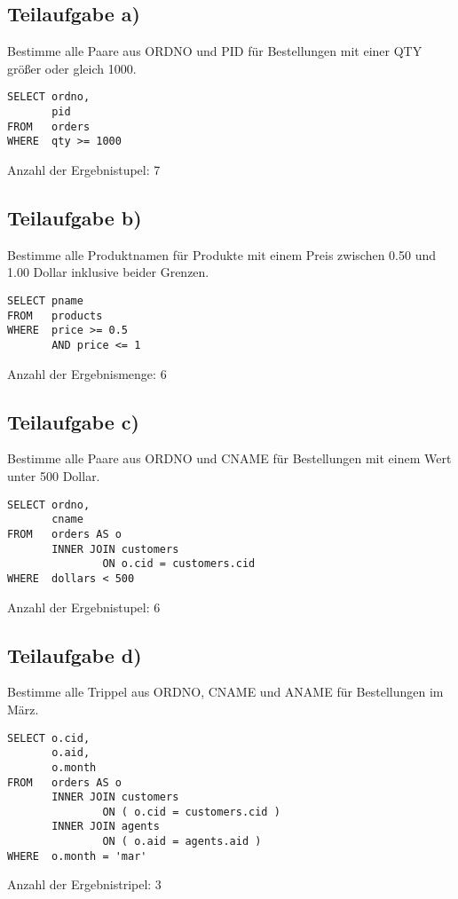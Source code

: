 \label{sec:Praktikumsaufgabe 2}
\lstset{language=SQL,numbers=none}

\subsection{Teilaufgabe a)}
\label{sec:Teilaufgabe a}
Bestimme alle Paare aus ORDNO und PID für Bestellungen mit einer QTY größer oder
gleich 1000.
\begin{lstlisting}
SELECT ordno, 
       pid 
FROM   orders 
WHERE  qty >= 1000
\end{lstlisting}
Anzahl der Ergebnistupel: 7

\subsection{Teilaufgabe b)}
\label{sec:Teilaufgabe b}
Bestimme alle Produktnamen für Produkte mit einem Preis zwischen 0.50 und 1.00
Dollar inklusive beider Grenzen.

\begin{lstlisting}
SELECT pname 
FROM   products 
WHERE  price >= 0.5 
       AND price <= 1
\end{lstlisting}
Anzahl der Ergebnismenge: 6


\subsection{Teilaufgabe c)}
\label{sec:Teilaufgabe c}
Bestimme alle Paare aus ORDNO und CNAME für Bestellungen mit einem Wert unter 500 Dollar.

\begin{lstlisting}
SELECT ordno, 
       cname 
FROM   orders AS o 
       INNER JOIN customers 
               ON o.cid = customers.cid 
WHERE  dollars < 500 
\end{lstlisting}
Anzahl der Ergebnistupel: 6


\subsection{Teilaufgabe d)}
\label{sec:Teilaufgabe d}
Bestimme alle Trippel aus ORDNO, CNAME und ANAME für Bestellungen im März.

\begin{lstlisting}
SELECT o.cid, 
       o.aid, 
       o.month 
FROM   orders AS o 
       INNER JOIN customers 
               ON ( o.cid = customers.cid ) 
       INNER JOIN agents 
               ON ( o.aid = agents.aid ) 
WHERE  o.month = 'mar'

\end{lstlisting}
Anzahl der Ergebnistripel: 3


